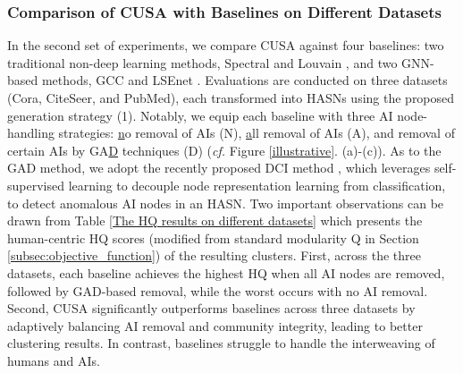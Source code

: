 \subsubsection{Comparison of CUSA with Baselines on Different Datasets} In the second set of experiments, we compare CUSA against four baselines: two traditional non-deep learning methods, Spectral \cite{amini2013pseudo} and Louvain \cite{blondel2008fast}, and two GNN-based methods, GCC \cite{fettal2022efficient} and LSEnet \cite{sun2024lsenet}. Evaluations are conducted on three datasets (Cora, CiteSeer, and PubMed), each transformed into HASNs using the proposed generation strategy (1). Notably, we equip each baseline with three AI node-handling strategies: \underline{n}o removal of AIs (N), \underline{a}ll removal of AIs (A), and removal of certain AIs by GA\underline{D} techniques (D) (\textit{cf.} Figure \ref{illustrative}. (a)-(c)). As to the GAD method, we adopt the recently proposed DCI method \cite{wang2021decoupling}, which leverages self-supervised learning to decouple node representation learning from classification, to detect anomalous AI nodes in an HASN. Two important observations can be drawn from Table \ref{The HQ results on different datasets} which presents the human-centric HQ scores (modified from standard modularity Q in Section \ref{subsec:objective_function}) of the resulting clusters.
First, across the three datasets, each baseline achieves the highest HQ when all AI nodes are removed, followed by GAD-based removal, while the worst occurs with no AI removal. Second, CUSA significantly outperforms baselines across three datasets by adaptively balancing AI removal and community integrity, leading to better clustering results. In contrast, baselines struggle to handle the interweaving of humans and AIs.

